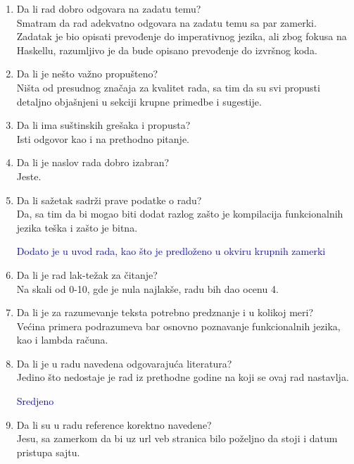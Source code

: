 \documentclass[a4paper]{report}
\newcommand{\odgovor}[1]{\textcolor{blue}{#1}}
\begin{document}
	\begin{enumerate}
		\item Da li rad dobro odgovara na zadatu temu?\\
		Smatram da rad adekvatno odgovara na zadatu temu sa par zamerki. Zadatak je bio opisati prevođenje do imperativnog jezika, ali zbog fokusa na Haskellu, razumljivo je da bude opisano prevođenje do izvršnog koda.
		
		\item Da li je nešto važno propušteno?\\
		Ništa od presudnog značaja za kvalitet rada, sa tim da su svi propusti detaljno objašnjeni u sekciji krupne primedbe i sugestije.
		
		\item Da li ima suštinskih grešaka i propusta?\\
		Isti odgovor kao i na prethodno pitanje.
		
		\item Da li je naslov rada dobro izabran?\\
		Jeste.
		
		\item Da li sažetak sadrži prave podatke o radu?\\
		Da, sa tim da bi mogao biti dodat razlog zašto je kompilacija funkcionalnih jezika teška i zašto je bitna.
		
		\odgovor{Dodato je u uvod rada, kao što je predloženo u okviru krupnih zamerki}
		
		\item Da li je rad lak-težak za čitanje?\\
		Na skali od 0-10, gde je nula najlakše, radu bih dao ocenu 4.
		
		\item Da li je za razumevanje teksta potrebno predznanje i u kolikoj meri?\\
		Većina primera podrazumeva bar osnovno poznavanje funkcionalnih jezika, kao i lambda računa.
		
		\item Da li je u radu navedena odgovarajuća literatura?\\
		Jedino što nedostaje je rad iz prethodne godine na koji se ovaj rad nastavlja.
		
		\odgovor{Sredjeno}
		
		\item Da li su u radu reference korektno navedene?\\
		Jesu, sa zamerkom da bi uz url veb stranica bilo poželjno da stoji i datum pristupa sajtu.
		

\end{enumerate}
\end{document}
